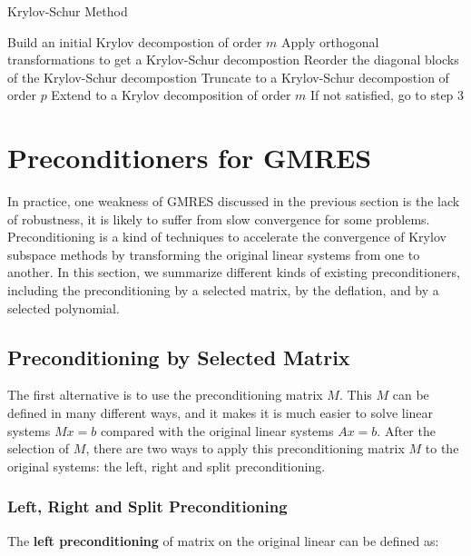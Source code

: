 \begin{algorithm}[htbp]{}
	\caption{Krylov-Schur Method}   
	\label{alg:krylov-schur}   
	\begin{algorithmic}[1]
		\State Build an initial Krylov decompostion of order $m$
		\State Apply orthogonal transformations to get a Krylov-Schur decompostion
		\State Reorder the diagonal blocks of the Krylov-Schur decompostion
		\State Truncate to a Krylov-Schur decompostion of order $p$
		\State Extend to a Krylov decomposition of order $m$
		\State If not satisfied, go to step 3
		\EndFunction
	\end{algorithmic}  
\end{algorithm}


\section{Preconditioners for GMRES}

In practice, one weakness of GMRES discussed in the previous section is the lack of robustness, it is likely to suffer from slow convergence for some problems. Preconditioning is a kind of techniques to accelerate the convergence of Krylov subspace methods by transforming the original linear systems from one to another. In this section, we summarize different kinds of existing preconditioners, including the preconditioning by a selected matrix, by the deflation, and by a selected polynomial.

\subsection{Preconditioning by Selected Matrix}

The first alternative is to use the preconditioning matrix $M$. This $M$ can be defined in many different ways, and it makes it is much easier to solve linear systems $Mx=b$ compared with the original linear systems $Ax=b$. After the selection of $M$, there are two ways to apply this preconditioning matrix $M$ to the original systems: the left, right and split preconditioning.

\subsubsection{Left, Right and Split Preconditioning}\label{Left, Right and Split Preconditioning}

The \textbf{left preconditioning} of matrix on the original linear can be defined as:

